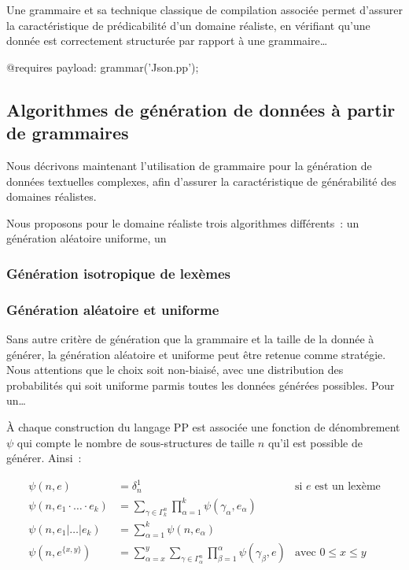 Une grammaire et sa technique classique de compilation associée permet d'assurer
la caractéristique de prédicabilité d'un domaine réaliste, en vérifiant qu'une
donnée est correctement structurée par rapport à une grammaire…

\begin{pre}
@requires payload: grammar('Json.pp');
\end{pre}

\subsection{Algorithmes de génération de données à partir de grammaires}
\label{subsection:data:algorithms}

Nous décrivons maintenant l'utilisation de grammaire pour la génération de
données textuelles complexes, afin d'assurer la caractéristique de générabilité
des domaines réalistes.

Nous proposons pour le domaine réaliste  trois algorithmes
différents~: un génération aléatoire uniforme, un 

\subsubsection{Génération isotropique de lexèmes}
\label{subsection:data:isotropic_generation}

\subsubsection{Génération aléatoire et uniforme}
\label{subsection:data:random_uniform_generation}

Sans autre critère de génération que la grammaire et la taille de la donnée à
générer, la génération aléatoire et uniforme peut être retenue comme stratégie.
Nous attentions que le choix soit non-biaisé, avec une distribution des
probabilités qui soit uniforme parmis toutes les données générées possibles.
Pour un…

À chaque construction du langage PP est associée une fonction de dénombrement
$\psi$ qui compte le nombre de sous-structures de taille $n$ qu'il est possible
de générer. Ainsi~:

\begin{align*}
%
\psi(n, e) & =
    \delta_n^1
    &
    \text{si $e$ est un lexème}
    \\
%
\psi(n, e_1 \cdot \dotso \cdot e_k) & =
    \sum_{\gamma \in \Gamma_k^n}
    \prod_{\alpha = 1}^k
    \psi(\gamma_\alpha, e_\alpha)
    \\
%
\psi(n, e_1 \vert \dots \vert e_k) & =
    \sum_{\alpha = 1}^k
    \psi(n, e_\alpha)
    \\
%
\psi(n, e^{\{x, y\}}) & =
    \sum_{\alpha = x}^y
    \sum_{\gamma \in \Gamma_\alpha^n}
    \prod_{\beta = 1}^\alpha
    \psi(\gamma_\beta, e)
    &
    \text{avec $0 \leq x \leq y$}
%
\end{align*}

